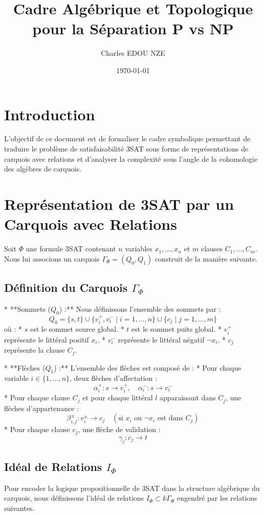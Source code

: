 \documentclass[11pt,a4paper]{article}
\title{Cadre Algébrique et Topologique pour la Séparation P vs NP}
\author{Charles EDOU NZE}
\date{\today}
\begin{document}
\maketitle

\section{Introduction}
L'objectif de ce document est de formaliser le cadre symbolique permettant de traduire le problème de satisfaisabilité 3SAT sous forme de représentations de carquois avec relations et d'analyser la complexité sous l'angle de la cohomologie des algèbres de carquois.

\section{Représentation de 3SAT par un Carquois avec Relations}
Soit $\Phi$ une formule 3SAT contenant $n$ variables $x_1, \dots, x_n$ et $m$ clauses $C_1, \dots, C_m$. Nous lui associons un carquois $\Gamma_{\Phi} = (Q_0, Q_1)$ construit de la manière suivante.

\subsection{Définition du Carquois $\Gamma_{\Phi}$}
* **Sommets ($Q_0$) :**
  Nous définissons l'ensemble des sommets par :
  $$ Q_0 = \{s, t\} \cup \{v_i^+, v_i^- \mid i=1,\dots,n\} \cup \{c_j \mid j=1,\dots,m\} $$
  où :
  * $s$ est le sommet source global.
  * $t$ est le sommet puits global.
  * $v_i^+$ représente le littéral positif $x_i$.
  * $v_i^-$ représente le littéral négatif $\neg x_i$.
  * $c_j$ représente la clause $C_j$.

* **Flèches ($Q_1$) :**
  L'ensemble des flèches est composé de :
  * Pour chaque variable $i \in \{1, \dots, n\}$, deux flèches d'affectation :
    $$ \alpha_i^+ : s \to v_i^+, \quad \alpha_i^- : s \to v_i^- $$
  * Pour chaque clause $C_j$ et pour chaque littéral $l$ apparaissant dans $C_j$, une flèches d'appartenance :
    $$ \beta_{i,j}^{\pm} : v_i^{\pm} \to c_j \quad (\text{si } x_i \text{ ou } \neg x_i \text{ est dans } C_j) $$
  * Pour chaque clause $c_j$, une flèche de validation :
    $$ \gamma_j : c_j \to t $$

\subsection{Idéal de Relations $I_{\Phi}$}
Pour encoder la logique propositionnelle de 3SAT dans la structure algébrique du carquois, nous définissons l'idéal de relations $I_{\Phi} \subset k\Gamma_{\Phi}$ engendré par les relations suivantes.
\end{document}
